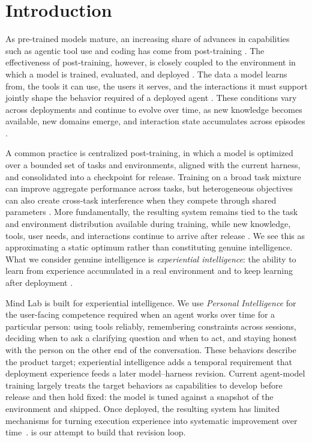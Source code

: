 \section{Introduction}
\label{sec:introduction}

As pre-trained models mature, an increasing share of advances in capabilities
such as agentic tool use and coding has come from post-training
\citep{openai_gpt55_2026,anthropic_opus48_2026,
kimi_k2_2025,glm5_2026}. The effectiveness of post-training, however, is
closely coupled to the environment in which a model is trained, evaluated, and
deployed
\citep{yao_second_half_2025,meta_harness_2026,
continual_harness_2026}. The data a model learns from, the tools it can use,
the users it serves, and the interactions it must support jointly shape the
behavior required of a deployed agent
\citep{when_cl_requires_learning_2026,continual_harness_2026,
meta_harness_2026}. These conditions vary across deployments and continue to
evolve over time, as new knowledge becomes available, new domains emerge, and
interaction state accumulates across episodes
\citep{tic_lm_2025,when_cl_requires_learning_2026,exg_2026}.

A common practice is centralized post-training, in which a model is optimized
over a bounded set of tasks and environments, aligned with the current harness,
and consolidated into a checkpoint for release. Training on a broad task
mixture can improve aggregate performance across tasks, but heterogeneous
objectives can also create cross-task interference when they compete through
shared parameters
\citep{badit_2026}. More fundamentally, the resulting system remains tied to
the task and environment distribution available during training, while new
knowledge, tools, user needs, and interactions continue to arrive after release
\citep{tic_lm_2025,when_cl_requires_learning_2026,
continual_harness_2026,exg_2026}. We see this as approximating a static optimum
rather than constituting genuine intelligence. What we consider genuine
intelligence is \emph{experiential intelligence}: the ability to learn from
experience accumulated in a real environment and to keep learning after
deployment
\citep{silver_sutton_experience_2025,yao_second_half_2025}.

Mind Lab is built for experiential intelligence. We use \emph{Personal
Intelligence} for the user-facing competence required when an agent works over
time for a particular person: using tools reliably, remembering constraints
across sessions, deciding when to ask a clarifying question and when to act,
and staying honest with the person on the other end of the conversation. These
behaviors describe the product target; experiential intelligence adds a
temporal requirement that deployment experience feeds a later model--harness
revision. Current agent-model training largely treats the target behaviors as
capabilities to develop before release and then hold fixed: the model is tuned
against a snapshot of the environment and shipped. Once deployed, the
resulting system has limited mechanisms for turning execution experience into
systematic improvement over time~\citep{exg_2026,continual_harness_2026}.
\macaron{} is our attempt to build that revision loop.

